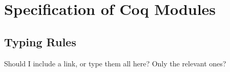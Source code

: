 \chapter{Specification of Coq Modules}

\section{Typing Rules} Should I include a link, or type them all here? Only the
relevant ones?